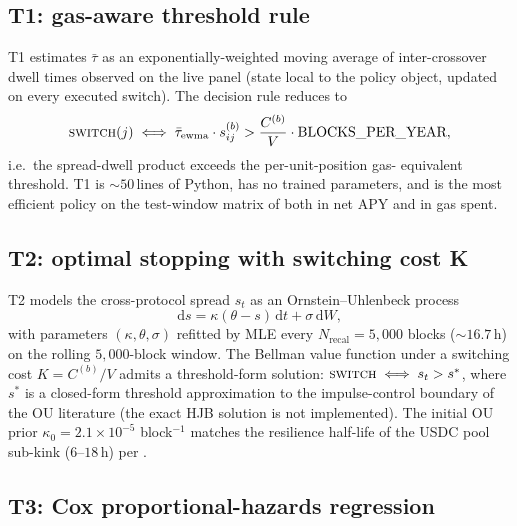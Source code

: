 \subsection{T1: gas-aware threshold rule}
\label{sec:methodology-t1}

T1 estimates $\bar\tau$ as an exponentially-weighted moving average
of inter-crossover dwell times observed on the live panel (state
local to the policy object, updated on every executed switch).  The
decision rule reduces to
\begin{equation}
\label{eq:t1}
\textsc{switch}(j) \iff
  \bar\tau_{\text{ewma}} \cdot s_{ij}^{(b)} > \frac{C^{(b)}}{V} \cdot \text{BLOCKS\_PER\_YEAR},
\end{equation}
i.e.\ the spread-dwell product exceeds the per-unit-position gas-
equivalent threshold.  T1 is $\sim 50$\,lines of Python, has no
trained parameters, and is the most efficient policy on the
test-window matrix of  both in net APY and
in gas spent.

\subsection{T2: optimal stopping with switching cost K}
\label{sec:methodology-t2}

T2 models the cross-protocol spread $s_t$ as an
Ornstein--Uhlenbeck process
\begin{equation}
\label{eq:ou}
\mathrm{d} s = \kappa(\theta - s)\,\mathrm{d} t + \sigma\,\mathrm{d} W,
\end{equation}
with parameters $(\kappa, \theta, \sigma)$ refitted by MLE every
$N_{\text{recal}} = 5{,}000$ blocks ($\sim 16.7$\,h) on the rolling
$5{,}000$-block window.  The Bellman value function under a
switching cost $K = C^{(b)} / V$ admits a threshold-form solution:
$\textsc{switch} \iff s_t > s^{*}$, where $s^{*}$ is a closed-form
threshold approximation to the impulse-control boundary of the OU
literature (the exact HJB solution is not implemented).  The initial OU prior
$\kappa_0 = 2.1 \times 10^{-5}$ block$^{-1}$ matches the resilience
half-life of the USDC pool sub-kink ($6$--$18$\,h) per
\cite{krause2005}.

\subsection{T3: Cox proportional-hazards regression}
\label{sec:methodology-t3}

